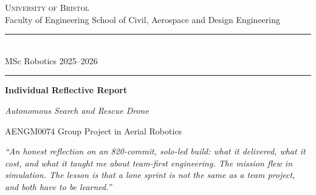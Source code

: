 %

\begin{titlepage}
  \centering
  \thispagestyle{empty}

  \vspace*{0.4cm}
  {\large\scshape University of Bristol}\\[2pt]
  {\small Faculty of Engineering \textbar{} School of Civil, Aerospace and Design Engineering}
  \vspace{0.5cm}

  \rule{0.55\textwidth}{0.6pt}\\[0.15cm]
  {\footnotesize MSc Robotics \textbar{} 2025--2026}\\[0.1cm]
  \rule{0.55\textwidth}{0.6pt}

  \vspace{1.4cm}

  {\Huge\bfseries\color{headblue} Individual Reflective Report\par}
  \vspace{0.35cm}
  {\LARGE\itshape Autonomous Search and Rescue Drone\par}
  \vspace{0.9cm}
  {\large AENGM0074 \textemdash{} Group Project in Aerial Robotics\par}

  \vspace{1.6cm}

  \begin{minipage}{0.78\textwidth}
    \centering\itshape\small
    ``An honest reflection on an 820-commit, solo-led build: what it delivered,
    what it cost, and what it taught me about team-first engineering.
    The mission flew in simulation. The lesson is that a lone sprint is not
    the same as a team project, and both have to be learned.''
  \end{minipage}


\end{titlepage}
